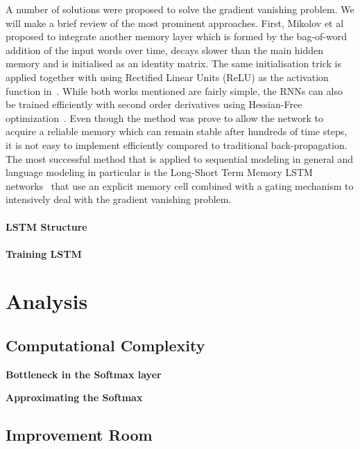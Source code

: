 A number of solutions were proposed to solve the gradient vanishing problem. We will make a brief review of the most prominent approaches. First, Mikolov et al~\cite{mikolov2014learning} proposed to integrate another memory layer which is formed by the bag-of-word addition of the input words over time, decays slower than the main hidden memory and is initialised as an identity matrix. The same initialisation trick is applied together with using Rectified Linear Units (ReLU) as the activation function in~\cite{le2015simple}. While both works mentioned are fairly simple, the RNNs can also be trained efficiently with second order derivatives using Hessian-Free optimization~\cite{martens2011learning}. Even though the method was prove to allow the network to acquire a reliable memory which can remain stable after hundreds of time steps, it is not easy to implement efficiently compared to traditional back-propagation. The most successful method that is applied to sequential modeling in general and language modeling in particular is the Long-Short Term Memory LSTM networks~\cite{hochreiter1997long} that use an explicit memory cell combined with a gating mechanism to intensively deal with the gradient vanishing problem.

\paragraph{LSTM Structure}

\paragraph{Training LSTM}




\section{Analysis}

\subsection{Computational Complexity}

\textbf{Bottleneck in the Softmax layer}

\textbf{Approximating the Softmax}

\subsection{Improvement Room} 
